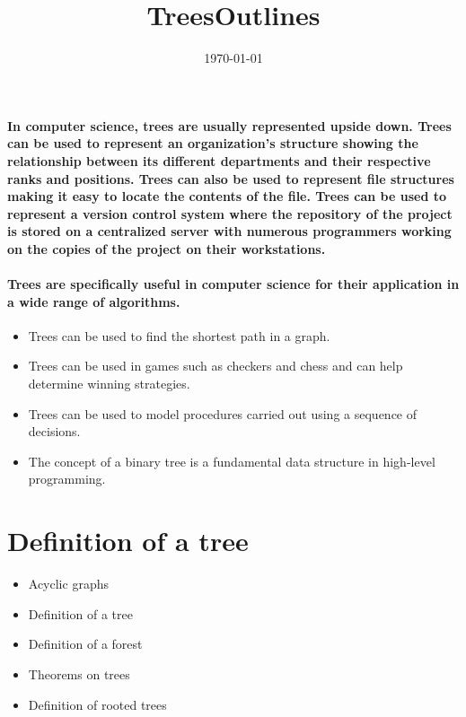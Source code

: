 \documentclass{article}
\title{Trees}
\date{\today}
\begin{document}
\maketitle

\paragraph{
  In computer science, trees are usually represented upside down. Trees can be used to represent an organization's structure showing the relationship between its different departments and their respective ranks and positions. Trees can also be used to represent file structures making it easy to locate the contents of the file. Trees can be used to represent a version control system where the repository of the project is stored on a centralized server with numerous programmers working on the copies of the project on their workstations.
}

\paragraph{
  Trees are specifically useful in computer science for their application in a wide range of algorithms.
}


\begin{itemize}
  \item Trees can be used to find the shortest path in a graph.
  \item Trees can be used in games such as checkers and chess and can help determine winning strategies.
  \item Trees can be used to model procedures carried out using a sequence of decisions.
  \item The concept of a binary tree is a fundamental data structure in high-level programming.
\end{itemize}

\section{Definition of a tree}

\title{Outlines}

\begin{itemize}
  \item Acyclic graphs
  \item Definition of a tree
  \item Definition of a forest
  \item Theorems on trees
  \item Definition of rooted trees
\end{itemize}
\end{document}
